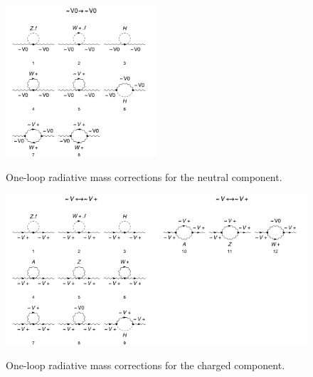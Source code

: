 \documentclass[11pt]{article}
\begin{document}
\begin{figure}[h]
\includegraphics[width=0.5\textwidth]{diagrams_V[6]_1.pdf}\\
\caption{One-loop radiative mass corrections for the neutral component.}\label{fig:1}
\end{figure}
\begin{figure}[h]
\includegraphics[width=0.5\textwidth]{diagrams_V[5]_1_1.pdf}\includegraphics[width=0.5\textwidth]{diagrams_V[5]_1_2.pdf}
\caption{One-loop radiative mass corrections for the charged component.}\label{fig:2}
\end{figure}
\end{document}
